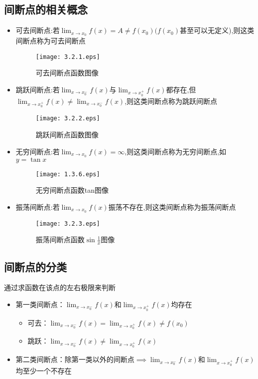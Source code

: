 \documentclass[12pt, a4paper, oneside, UTF8]{ctexbook}
\begin{document}
\subsection{间断点的相关概念}
\begin{itemize}
    \item 可去间断点:若$\lim_{x\to x_0}f(x)=A\neq f(x_0)(f(x_0)$甚至可以无定义),则这类间断点称为可去间断点
          \begin{figure}[H]
              \centering \texttt{[image: 3.2.1.eps]} \caption{可去间断点函数图像}
          \end{figure}
    \item 跳跃间断点:若$\lim_{x\to x_0^-}f(x)$与$\lim_{x\to x_0^+}f(x)$都存在,但$\lim_{x\to x_0^+}f(x)\neq\lim_{x\to x_0^-}f(x)$,则这类间断点称为跳跃间断点
          \begin{figure}[H]
              \centering \texttt{[image: 3.2.2.eps]} \caption{跳跃间断点函数图像}
          \end{figure}
    \item 无穷间断点:若$\lim_{x\to x_0}f(x)=\infty$,则这类间断点称为无穷间断点,如$y=\tan x$
          \begin{figure}[H]
              \centering \texttt{[image: 1.3.6.eps]} \caption{无穷间断点函数tan图像}
          \end{figure}
    \item 振荡间断点:若$\lim_{x\to x_0}f(x)$振荡不存在,则这类间断点称为振荡间断点
          \begin{figure}[H]
              \centering \texttt{[image: 3.2.3.eps]} \caption{振荡间断点函数$\sin \frac{1}{x}$图像}
          \end{figure}
\end{itemize}
\subsection{间断点的分类}
通过求函数在该点的左右极限来判断
\begin{itemize}
    \item 第一类间断点：$\lim _ { x \rightarrow x _ { 0 } ^{-}} f ( x )$​ 和$\lim _ { x \rightarrow x _ { 0 }^ {+}} f ( x )$​ 均存在
          \begin{itemize}
              \item 可去：$\lim _ { x \rightarrow x_0 ^ { - } } f ( x ) = \lim _ { x \rightarrow x_0^{+} } f  ( x ) \neq f(x_0)$
              \item 跳跃：$\lim _ { x \rightarrow x_0^{-} } f ( x ) \not= \lim _ { x \rightarrow x_0^{+} } f ( x )$
          \end{itemize}
    \item 第二类间断点：除第一类以外的间断点$\implies \lim _ { x \rightarrow x _ { 0 } ^{-}} f ( x )$和$\lim _ { x \rightarrow x _ { 0 }^ {+}} f ( x )$​ 均至少一个不存在
\end{itemize}
\ifx\allfiles\undefined
\end{document}
